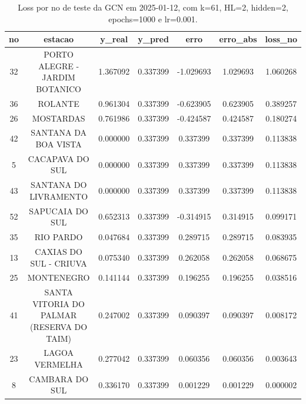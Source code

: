 \begin{table}[h]
\centering
\caption{Loss por no de teste da GCN em 2025-01-12, com k=61, HL=2, hidden=2, epochs=1000 e lr=0.001.}
\label{tab:gcn_loss_k61_hl2_h2_e1000_d20250112}
\begin{tabular}{ccccccc}
\toprule
no & estacao & y\_real & y\_pred & erro & erro\_abs & loss\_no \\
\midrule
32 & PORTO ALEGRE - JARDIM BOTANICO & 1.367092 & 0.337399 & -1.029693 & 1.029693 & 1.060268 \\
36 & ROLANTE & 0.961304 & 0.337399 & -0.623905 & 0.623905 & 0.389257 \\
26 & MOSTARDAS & 0.761986 & 0.337399 & -0.424587 & 0.424587 & 0.180274 \\
42 & SANTANA DA BOA VISTA & 0.000000 & 0.337399 & 0.337399 & 0.337399 & 0.113838 \\
5 & CACAPAVA DO SUL & 0.000000 & 0.337399 & 0.337399 & 0.337399 & 0.113838 \\
43 & SANTANA DO LIVRAMENTO & 0.000000 & 0.337399 & 0.337399 & 0.337399 & 0.113838 \\
52 & SAPUCAIA DO SUL & 0.652313 & 0.337399 & -0.314915 & 0.314915 & 0.099171 \\
35 & RIO PARDO & 0.047684 & 0.337399 & 0.289715 & 0.289715 & 0.083935 \\
13 & CAXIAS DO SUL - CRIUVA & 0.075340 & 0.337399 & 0.262058 & 0.262058 & 0.068675 \\
25 & MONTENEGRO & 0.141144 & 0.337399 & 0.196255 & 0.196255 & 0.038516 \\
41 & SANTA VITORIA DO PALMAR (RESERVA DO TAIM) & 0.247002 & 0.337399 & 0.090397 & 0.090397 & 0.008172 \\
23 & LAGOA VERMELHA & 0.277042 & 0.337399 & 0.060356 & 0.060356 & 0.003643 \\
8 & CAMBARA DO SUL & 0.336170 & 0.337399 & 0.001229 & 0.001229 & 0.000002 \\
\bottomrule
\end{tabular}
\end{table}
